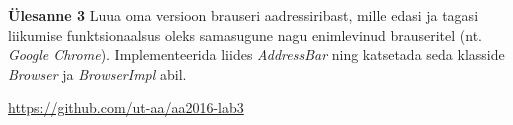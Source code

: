 \documentclass[a4paper]{article}
\begin{document}
\begin{problem}
\textbf{Ülesanne 3}
\newline
Luua oma versioon brauseri aadressiribast, mille edasi ja tagasi liikumise funktsionaalsus oleks samasugune nagu enimlevinud brauseritel (nt. \textit{Google Chrome}). Implementeerida liides \textit{AddressBar} ning katsetada seda klasside \textit{Browser} ja \textit{BrowserImpl} abil.
\end{problem}

\url{https://github.com/ut-aa/aa2016-lab3}
\end{document}
